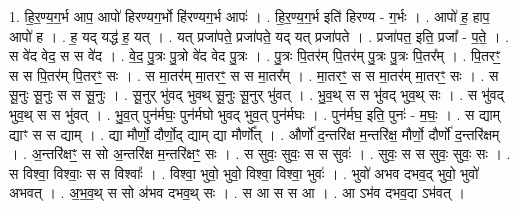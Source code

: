 \documentclass[17pt]{extarticle}
\begin{document}
1. हि॒र॒ण्य॒ग॒र्भ आप॒ आपो॑ हिरण्यग॒र्भो हि॑रण्यग॒र्भ आपः॑ । . हि॒र॒ण्य॒ग॒र्भ इति॑ हिरण्य - ग॒र्भः । . आपो॑ ह॒ हाप॒ आपो॑ ह । . ह॒ यद् यद्ध॑ ह॒ यत् । . यत् प्रजा॑पते॒ प्रजा॑पते॒ यद् यत् प्रजा॑पते । . प्रजा॑पत॒ इति॒ प्रजा᳚ - प॒ते॒ । . स वे॑द वेद॒ स स वे॑द । . वे॒द॒ पु॒त्रः पु॒त्रो वे॑द वेद पु॒त्रः । . पु॒त्रः पि॒तर॑म् पि॒तर॑म् पु॒त्रः पु॒त्रः पि॒तर᳚म् । . पि॒तरꣳ॒॒ स स पि॒तर॑म् पि॒तरꣳ॒॒ सः । . स मा॒तर॑म् मा॒तरꣳ॒॒ स स मा॒तर᳚म् । . मा॒तरꣳ॒॒ स स मा॒तर॑म् मा॒तरꣳ॒॒ सः । . स सू॒नुः सू॒नुः स स सू॒नुः । . सू॒नुर् भु॑वद् भुवथ् सू॒नुः सू॒नुर् भु॑वत् । . भु॒व॒थ् स स भु॑वद् भुव॒थ् सः । . स भु॑वद् भुव॒थ् स स भु॑वत् । . भु॒व॒त् पुन॑र्मघः॒ पुन॑र्मघो भुवद् भुव॒त् पुन॑र्मघः । . पुन॑र्मघ॒ इति॒ पुनः॑ - म॒घः॒ । . स द्याम् द्याꣳ स स द्याम् । . द्या मौर्णो॒ दौर्णो॒द् द्याम् द्या मौर्णो᳚त् । . और्णो॑ द॒न्तरि॑क्ष म॒न्तरि॑क्ष॒ मौर्णो॒ दौर्णो॑ द॒न्तरि॑क्षम् । . अ॒न्तरि॑क्षꣳ॒॒ स सो अ॒न्तरि॑क्ष म॒न्तरि॑क्षꣳ॒॒ सः । . स सुवः॒ सुवः॒ स स सुवः॑ । . सुवः॒ स स सुवः॒ सुवः॒ सः । . स विश्वा॒ विश्वाः॒ स स विश्वाः᳚ । . विश्वा॒ भुवो॒ भुवो॒ विश्वा॒ विश्वा॒ भुवः॑ । . भुवो॑ अभव दभव॒द् भुवो॒ भुवो॑ अभवत् । . अ॒भ॒व॒थ् स सो अ॑भव दभव॒थ् सः । . स आ स स आ । . आ ऽभ॑व दभव॒दा ऽभ॑वत् । \newline
\end{document}
